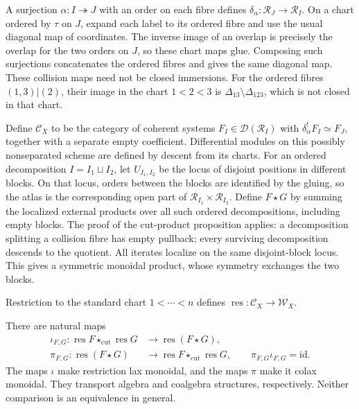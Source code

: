 A surjection \(\alpha:I\twoheadrightarrow J\) with an order
on each fibre defines \(\delta_\alpha:\mathscr R_J\to\mathscr R_I\).
On a chart ordered by \(\tau\) on \(J\), expand each label
to its ordered fibre and use the usual diagonal map of coordinates.
The inverse image of an overlap is precisely the overlap for the
two orders on \(J\), so these chart maps glue. Composing such
surjections concatenates the ordered fibres and gives the same
diagonal map. These collision maps need not be closed immersions.
For the ordered fibres \((1,3)|(2)\), their image in the chart
\(1<2<3\) is \(\Delta_{13}\setminus\Delta_{123}\), which
is not closed in that chart.

Define \(\mathcal C_X\) to be the category of coherent systems
\(F_I\in\mathcal D(\mathscr R_I)\) with
\(\delta_\alpha^!F_I\simeq F_J\), together with a separate
empty coefficient. Differential modules on this possibly
nonseparated scheme are defined by descent from its charts.
For an ordered decomposition \(I=I_1\sqcup I_2\), let \(U_{I_1,I_2}\)
be the locus of disjoint positions in different blocks. On that
locus, orders between the blocks are identified by the gluing,
so the atlas is the corresponding open part of
\(\mathscr R_{I_1}\times\mathscr R_{I_2}\). Define \(F\star G\)
by summing the localized external products over all such ordered
decompositions, including empty blocks. The proof of the cut-product
proposition applies: a decomposition splitting a collision fibre
has empty pullback; every surviving decomposition descends to the
quotient. All iterates localize on the same disjoint-block locus.
This gives a symmetric monoidal product, whose symmetry exchanges
the two blocks.

Restriction to the standard chart \(1<\cdots<n\) defines
\(\operatorname{res}:\mathcal C_X\to\mathcal W_X\).

\begin{proposition}
\label{v4-prop:word-atlas-comparison}
There are natural maps
\begin{align*}
 \iota_{F,G}:\operatorname{res}F\star_{\mathrm{cut}}
                    \operatorname{res}G
       &\longrightarrow\operatorname{res}(F\star G),\\
 \pi_{F,G}:\operatorname{res}(F\star G)
       &\longrightarrow\operatorname{res}F\star_{\mathrm{cut}}
                    \operatorname{res}G,
 \qquad \pi_{F,G}\iota_{F,G}=\mathrm{id}.
\end{align*}
The maps \(\iota\) make restriction lax monoidal, and the maps
\(\pi\) make it colax monoidal. They transport algebra and
coalgebra structures, respectively. Neither comparison is an
equivalence in general.
\end{proposition}

